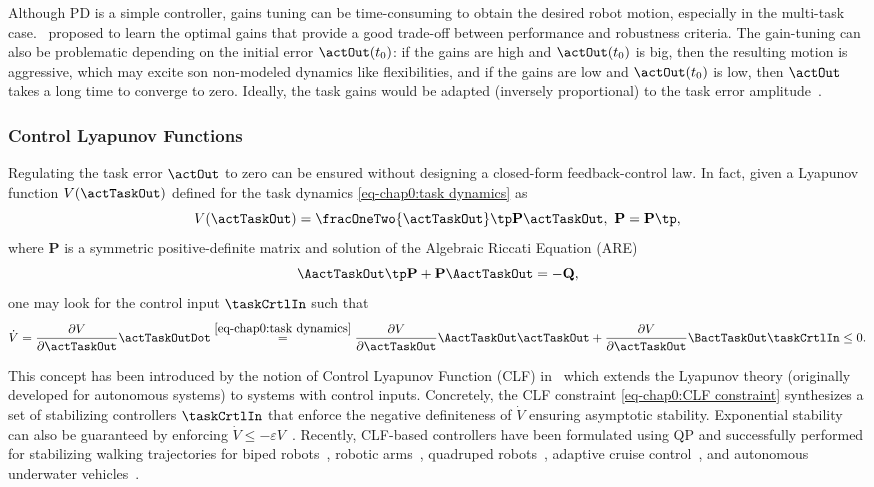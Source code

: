 Although PD is a simple controller, gains tuning can be time-consuming to obtain the desired robot motion, especially in the multi-task case.~\cite{penco2020ral} proposed to learn the optimal gains that provide a good trade-off between performance and robustness criteria. The gain-tuning can also be problematic depending on the initial error $\actOut(t_0)$: if the gains are high and  $\actOut(t_0)$ is big, then the resulting motion is aggressive, which may excite son non-modeled dynamics like flexibilities, and if the gains are low and $\actOut(t_0)$ is low, then $\actOut$ takes a long time to converge to zero. Ideally, the task gains would be adapted (inversely proportional) to the task error amplitude~\cite{keith2009iros}.
\subsubsection{Control Lyapunov Functions}
Regulating the task error $\actOut$ to zero can be ensured without designing a closed-form feedback-control law. In fact, given a Lyapunov function $V(\actTaskOut)$ defined for the task dynamics \cref{eq-chap0:task dynamics} as 
\begin{equation}
	V(\actTaskOut) = \fracOneTwo{\actTaskOut}\tp\mathbf{P}\actTaskOut, \ \mathbf{P}= \mathbf{P}\tp,
\end{equation}
where $\mathbf{P}$ is a symmetric positive-definite matrix and solution of the Algebraic Riccati Equation (ARE)
\begin{equation}
	{\AactTaskOut}\tp\mathbf{P} +\mathbf{P}\AactTaskOut = -\mathbf{Q},
\end{equation}
 one may look for the control input $\taskCrtlIn$ such that 
\begin{equation}\label{eq-chap0:CLF constraint}
	\dot{V} = \frac{\partial V}{\partial \actTaskOut}\actTaskOutDot \overset{\cref{eq-chap0:task dynamics}}{=}\frac{\partial V}{\partial \actTaskOut}\AactTaskOut\actTaskOut + 
	\frac{\partial V}{\partial \actTaskOut}\BactTaskOut \taskCrtlIn \leq 0.
\end{equation}

This concept has been introduced by the notion of Control Lyapunov Function (CLF) in~\cite{artstein1983nonlinearAnalysis,sontag1983siam,sontag1989scl,tsinias1989springer} which extends the Lyapunov theory (originally developed for autonomous systems) to systems with control inputs. Concretely, the CLF constraint \cref{eq-chap0:CLF constraint} synthesizes a set of stabilizing controllers $\taskCrtlIn$ that enforce the negative definiteness of $\dot{V}$ ensuring  asymptotic stability. Exponential stability can also be guaranteed by enforcing $\dot{V} \leq -\varepsilon V$~\cite{ames2014tac}. Recently, CLF-based controllers have been formulated using QP and successfully performed for stabilizing walking trajectories for biped robots~\cite{ames2012cdc,ames2013hscc,ames2014tac,galloway2015ieeeAccess,ma2017hscc,reher2020acc}, robotic arms~\cite{murtaza2022ral}, quadruped robots~\cite{ma2021ral}, adaptive cruise control~\cite{ames2014cdc,ames2017tac,mehra2015acc}, and autonomous underwater vehicles~\cite{basso2020ifac}. 

